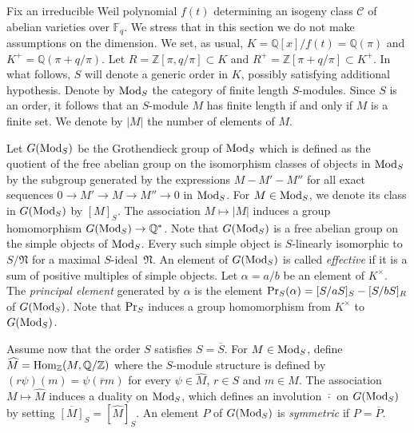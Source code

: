 \documentclass[11pt]{amsart}
\newcommand\Fq{\mathbb{F}_q}
\newcommand\Q{\mathbb{Q}}
\newcommand\Z{\mathbb{Z}}
\def\Hom{\mathop{\rm Hom}\nolimits}
\def\Mod{\mathop{\rm Mod}\nolimits}
\def\Pr{\mathop{\rm Pr}\nolimits}
\newcommand\cC{\mathcal{C}}
\newcommand\frN{\mathfrak{N}}
\theoremstyle{plain}
\theoremstyle{definition}
\begin{document}
\smallskip
Fix an irreducible Weil polynomial $f(t)$ determining an isogeny class $\cC$ of abelian varieties over $\Fq$.
We stress that in this section we do not make assumptions on the dimension.
We set, as usual, $K=\Q[x]/f(t)=\Q(\pi)$ and $K^+=\Q(\pi+q/\pi)$.
Let $R=\Z[\pi,q/\pi]\subset K$ and $R^+=\Z[\pi+q/\pi]\subset K^+$.
In what follows, $S$ will denote a generic order in $K$, possibly satisfying additional hypothesis.
Denote by $\Mod_S$ the category of finite length $S$-modules.
Since $S$ is an order, it follows that an $S$-module $M$ has finite length if and only if $M$ is a finite set.
We denote by $|M|$ the number of elements of $M$.

Let $G(\Mod_S)$ be the Grothendieck group of $\Mod_S$ which is defined as the quotient of the free abelian group on the isomorphism classes of objects in $\Mod_S$ by the subgroup generated by the expressions $M-M'-M''$ for all exact sequences $0\to M'\to M\to M''\to 0$ in $\Mod_S$.
For $M\in\Mod_S$, we denote its class in $G(\Mod_S)$ by $[M]_S$.
The association $M\mapsto |M|$ induces a group homomorphism $G(\Mod_S) \to \Q^*$.
Note that $G(\Mod_S)$ is a free abelian group on the simple objects of $\Mod_S$.
Every such simple object is $S$-linearly isomorphic to $S/\frN$ for a maximal $S$-ideal~$\frN$.
An element of $G(\Mod_S)$ is called \emph{effective} if it is a sum of positive multiples of simple objects.
Let $\alpha=a/b$ be an element of $K^\times$.
The \emph{principal element} generated by $\alpha$ is the element $\Pr_S(\alpha)=[S/a S]_S-[S/bS]_R$ of $G(\Mod_S)$.
Note that $\Pr_S$ induces a group homomorphism from $K^\times$ to $G(\Mod_S)$.


Assume now that the order $S$ satisfies $S=\overline{S}$.
For $M \in \Mod_S$, define $\widehat{M}=\Hom_\Z(M,\Q/\Z)$ where the $S$-module structure is defined by $(r\psi)(m)=\psi(\overline{r}m)$ for every $\psi\in \widehat{M}$, $r\in S$ and $m \in M$.
The association $M\mapsto \widehat{M}$ induces a duality on $\Mod_S$, which defines an involution $\overline \cdot$ on $G(\Mod_S)$ by setting $\overline{[M]}_S=[\widehat{M}]_S$.
An element $P$ of $G(\Mod_S)$ is \emph{symmetric} if $P=\overline P$.
\end{document}
